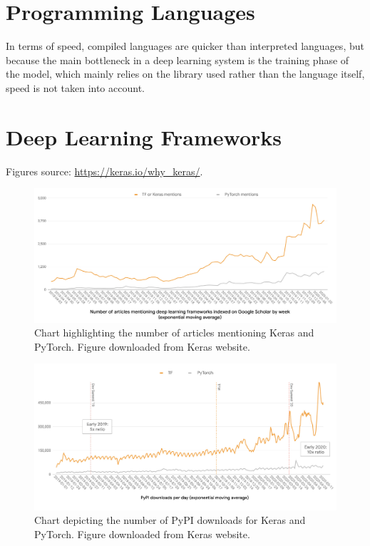 \section{Programming Languages}
\label{sec:appendix-programming-languages-comparison}

In terms of speed, compiled languages are quicker than interpreted languages, but because the main bottleneck in a deep learning system is the training phase of the model, which mainly relies on the library used rather than the language itself, speed is not taken into account. 



\section{Deep Learning Frameworks}
\label{sec:appendix-keras_vs_pytorch}

Figures source: \url{https://keras.io/why_keras/}.

\begin{figure}[ht]
\centerline{\includegraphics[width=1.1\textwidth]{figures/appendix/keras_vs_pytorch_mentions.jpeg}}
\caption{Chart highlighting the number of articles mentioning Keras and PyTorch. Figure downloaded from Keras website.}
\end{figure}

\begin{figure}[ht]
\centerline{\includegraphics[width=1.1\textwidth]{figures/appendix/keras_vs_pytorch_downloads.jpg}}
\caption{Chart depicting the number of PyPI downloads for Keras and PyTorch. Figure downloaded from Keras website.}
\end{figure}
